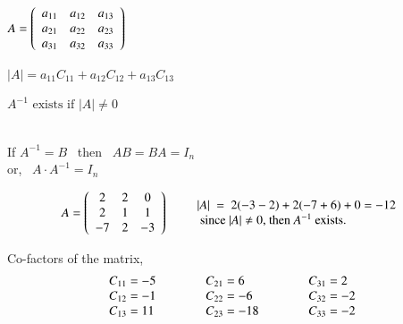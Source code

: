 \documentclass[12pt]{article}
\renewenvironment{pmatrix}
{\left(\begin{array}{ccc}}
{\end{array}\right)}
\begin{document}
\vspace*{2ex}
\begin{minipage}[t]{0.2\textwidth}
$A=\begin{pmatrix}
   a_{11} & a_{12} & a_{13} \\
   a_{21} & a_{22} & a_{23} \\
   a_{31} & a_{32} & a_{33}
\end{pmatrix}$
\end{minipage}
\hspace{1.25cm}
\begin{minipage}[t]{0.3\textwidth}
\vspace*{-\baselineskip}
   $|A|=a_{11} C_{11}+a_{12} C_{12}+a_{13} C_{13}$
   
   $A^{-1} \text{ exists if \ } |A| \neq 0$
   
\end{minipage}
\hspace{0.6cm}
\begin{minipage}[t]{0.3\textwidth}
\vspace*{-\baselineskip}
\\
If $A^{-1} = B$ \ then \ $AB=BA=I_n$\\
or, \ $A \cdot A^{-1}=I_n$
\end{minipage}


\vspace*{2ex}
\begin{equation*}
A = \begin{pmatrix}
      2 & 2 & 0 \\ 2 & 1 & 1 \\ -7 & 2 & -3
   \end{pmatrix}
\quad \begin{array}{ll} 
& |A| \ =\ 2(-3-2)+2(-7+6)+0=-12 \\
& \text { since }|A| \neq 0 \text {, then } A^{-1} \text { exists. }
\end{array}
\end{equation*}


Co-factors of the matrix,
$$\begin{array}{lll}
C_{11}=-5 \ \ \ \ \ \  & \ \ \ \ \ \  C_{21}=6 \ \ \ \ \ \  & \ \ \ \ \ \  C_{31}=2 \\
C_{12}=-1 \ \ \ \ \ \  & \ \ \ \ \ \  C_{22}=-6 \ \ \ \ \ \  & \ \ \ \ \ \  C_{32}=-2 \\
C_{13}=11 \ \ \ \ \ \  & \ \ \ \ \ \  C_{23}=-18 \ \ \ \ \ \  & \ \ \ \ \ \  C_{33}=-2 \\
\end{array}$$
\end{document}
